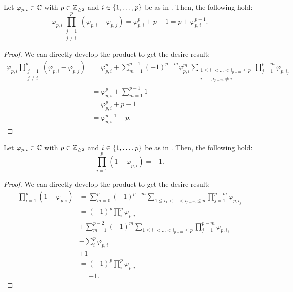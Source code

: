\documentclass{article}
\begin{document}
    \begin{corollary} \label{cor:A-5}
      Let $\varphi_{p, i} \in \mathbb C$ with $p \in \mathbb{Z}_{\geq 2}$ and $i \in \{1, \dots, p\}$ be as in . Then, the following hold:
      \begin{equation} 
        \varphi_{p, i} \prod_{\substack{j=1 \\ j \neq i}}^{p} (\varphi_{p, i} - \varphi_{p, j})
        =  \varphi_{p, i}^{p} + p -1 =  p + \varphi_{p, i}^{p-1}.
      \end{equation}
    \end{corollary}

    \begin{proof}
      We can directly develop the product to get the desire result:
      \begin{align}
        \varphi_{p, i} \prod_{\substack{j=1 \\ j \neq i}}^{p} (\varphi_{p, i} - \varphi_{p, j}) 
        &= \varphi_{p, i}^p + \sum_{m=1}^{p-1} (-1)^{p-m} \varphi_{p, i}^{m} 
        \sum_{\substack{1 \leq i_1 < \dots < i_{p-m} \leq p \\ i_1, \dots, i_{p-m} \neq i}} \prod_{j=1}^{p-m} \varphi_{p, i_j} \\
        &= \varphi_{p, i}^p + \sum_{m=1}^{p-1} 1 \\
        &= \varphi_{p, i}^p + p - 1 \\
        &= \varphi_{p, i}^{p-1} + p.
      \end{align}
    \end{proof}

    \begin{corollary} \label{cor:A-6}
      Let $\varphi_{p, i} \in \mathbb C$ with $p \in \mathbb{Z}_{\geq 2}$ and $i \in \{1, \dots, p\}$ be as in . Then, the following hold:
      \begin{equation} 
        \prod_{i=1}^{p} (1 - \varphi_{p, i}) = -1.
      \end{equation}
    \end{corollary}

    \begin{proof}
      We can directly develop the product to get the desire result:
      \begin{align}
        \prod_{i=1}^{p} (1 - \varphi_{p, i})
        & = \sum_{m=0}^{p} (-1)^{p-m} \sum_{1 \leq i_1 < \dots < i_{p-m} \leq p} \prod_{j=1}^{p-m} \varphi_{p, i_j}\\
        & = (-1)^{p} \prod_{i}^p \varphi_{p, i} \\
        \nonumber & + \sum_{m=1}^{p-2} (-1)^{m} \sum_{1 \leq i_1 < \dots < i_{p-m} \leq p} \prod_{j=1}^{p-m} \varphi_{p, i_j} \\
        \nonumber & - \sum_{i}^p \varphi_{p, i} \\
        \nonumber & + 1 \\
        & = (-1)^{p}\prod_{i}^p \varphi_{p, i} \\
        & = -1.
      \end{align}
    \end{proof}
\end{document}
